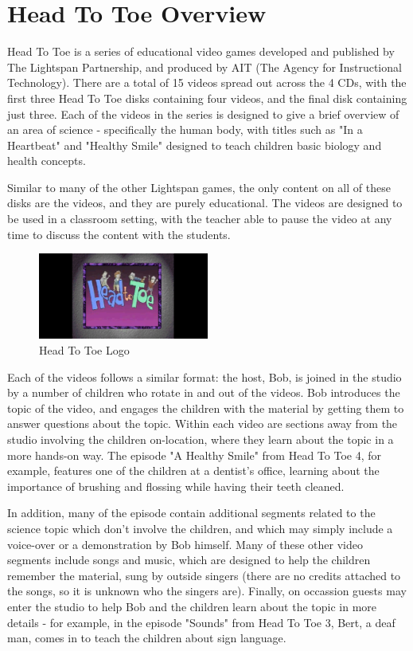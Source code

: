 \chapter{Head To Toe Overview}

Head To Toe is a series of educational video games developed and published by The Lightspan Partnership, and produced by AIT (The Agency for Instructional Technology). There are a total of 15 videos spread out across the 4 CDs, with the first three Head To Toe disks containing four videos, and the final disk containing just three. Each of the videos in the series is designed to give a brief overview of an area of science - specifically the human body, with titles such as "In a Heartbeat" and "Healthy Smile" designed to teach children basic biology and health concepts.

Similar to many of the other Lightspan games, the only content on all of these disks are the videos, and they are purely educational. The videos are designed to be used in a classroom setting, with the teacher able to pause the video at any time to discuss the content with the students.

\begin{figure}[H]
    \centering
    \includegraphics[width=0.5\textwidth]{./Games/HeadtoToe/Images/HeadToToeMainImage.png}
    \caption{Head To Toe Logo}
\end{figure}

Each of the videos follows a similar format: the host, Bob, is joined in the studio by a number of children who rotate in and out of the videos. Bob introduces the topic of the video, and engages the children with the material by getting them to answer questions about the topic. Within each video are sections away from the studio involving the children on-location, where they learn about the topic in a more hands-on way. The episode "A Healthy Smile" from Head To Toe 4, for example, features one of the children at a dentist's office, learning about the importance of brushing and flossing while having their teeth cleaned.

In addition, many of the episode contain additional segments related to the science topic which don't involve the children, and which may simply include a voice-over or a demonstration by Bob himself. Many of these other video segments include songs and music, which are designed to help the children remember the material, sung by outside singers (there are no credits attached to the songs, so it is unknown who the singers are). Finally, on occassion guests may enter the studio to help Bob and the children learn about the topic in more details - for example, in the episode "Sounds" from Head To Toe 3, Bert, a deaf man, comes in to teach the children about sign language.

